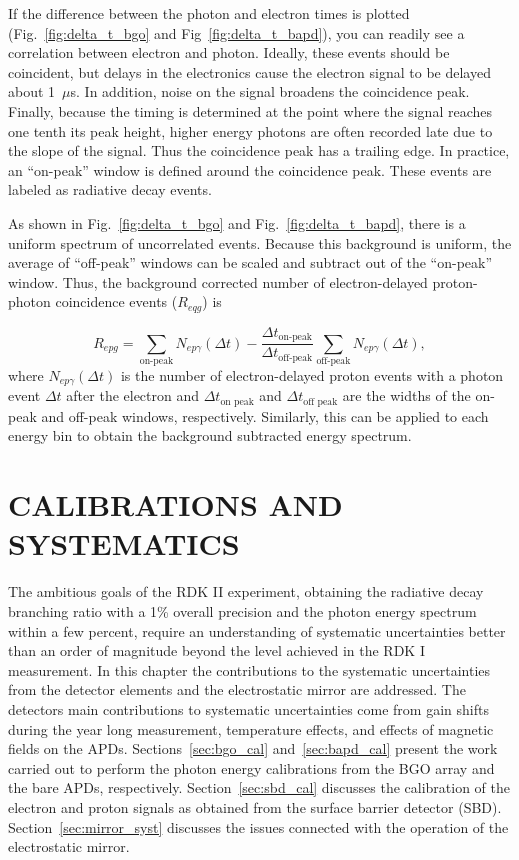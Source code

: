\documentclass[oneside,12pt]{memoir}
\begin{document}
If the difference between the photon and electron times is plotted (Fig.~\ref{fig:delta_t_bgo} and Fig~\ref{fig:delta_t_bapd}), you can readily see a correlation between electron and photon. Ideally, these events should be coincident, but delays in the electronics cause the electron signal to be delayed about 1~$\mu$s. In addition, noise on the signal broadens the coincidence peak. Finally, because the timing is determined at the point where the signal reaches one tenth its peak height, higher energy photons are often recorded late due to the slope of the signal. Thus the coincidence peak has a trailing edge. In practice, an ``on-peak'' window is defined around the coincidence peak. These events are labeled as radiative decay events.\par
As shown in Fig.~\ref{fig:delta_t_bgo} and Fig.~\ref{fig:delta_t_bapd}, there is a uniform spectrum of uncorrelated events. Because this background is uniform, the average of ``off-peak'' windows can be scaled and subtract out of the ``on-peak'' window. Thus, the background corrected number of electron-delayed proton-photon coincidence events ($R_{eqg}$) is\par
\begin{equation}
	\label{eq:bg_sub}
	R_{epg}=\sum_\textrm{on-peak}N_{ep\gamma}
		\left(\Delta t\right)-\frac{\Delta t_\textrm{on-peak}}
		{\Delta t_\textrm{off-peak}}\sum_\textrm{off-peak}N_{ep\gamma}
		\left(\Delta t\right),
\end{equation}
where $N_{ep\gamma}\left(\Delta t\right)$ is the number of electron-delayed proton events with a photon event $\Delta t$ after the electron and $\Delta t_\textrm{on~peak}$ and $\Delta t_\textrm{off~peak}$ are the widths of the on-peak and off-peak windows, respectively. Similarly, this can be applied to each energy bin to obtain the background subtracted energy spectrum.
\chapter{CALIBRATIONS AND SYSTEMATICS}
\label{ch:calibration}
The ambitious goals of the RDK II experiment, obtaining the radiative decay branching ratio with a 1\% overall precision and the photon energy spectrum within a few percent, require an understanding of systematic uncertainties better than an order of magnitude beyond the level achieved in the RDK I measurement. In this chapter the contributions to the systematic uncertainties from the detector elements and the electrostatic mirror are addressed. The detectors main contributions to systematic uncertainties come from gain shifts during the year long measurement, temperature effects, and effects of magnetic fields on the APDs. Sections~\ref{sec:bgo_cal} and~\ref{sec:bapd_cal} present the work carried out to perform the photon energy calibrations from the BGO array and the bare APDs, respectively. Section~\ref{sec:sbd_cal} discusses the calibration of the electron and proton signals as obtained from the surface barrier detector (SBD). Section~\ref{sec:mirror_syst} discusses the issues connected with the operation of the electrostatic mirror.
\end{document}
